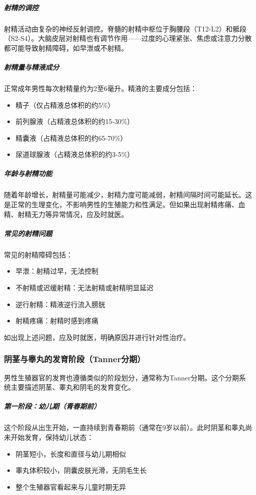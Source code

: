 \subparagraph{射精的调控}

射精活动由复杂的神经反射调控。脊髓的射精中枢位于胸腰段（T12-L2）和骶段（S2-S4）。大脑皮层对射精也有调节作用——过度的心理紧张、焦虑或注意力分散都可能导致射精障碍，如早泄或不射精。

\subparagraph{射精量与精液成分}

正常成年男性每次射精量约为2至6毫升。精液的主要成分包括：
\begin{itemize}
    \item 精子（仅占精液总体积的约5\%）
    \item 前列腺液（占精液总体积的约15-30\%）
    \item 精囊液（占精液总体积的约65-70\%）
    \item 尿道球腺液（占精液总体积的约3-5\%）
\end{itemize}

\subparagraph{年龄与射精功能}

随着年龄增长，射精量可能减少，射精力度可能减弱，射精间隔时间可能延长。这是正常的生理变化，不影响男性的生殖能力和性满足。但如果出现射精疼痛、血精、射精无力等异常情况，应及时就医。

\subparagraph{常见的射精问题}

常见的射精障碍包括：
\begin{itemize}
    \item 早泄：射精过早，无法控制
    \item 不射精或迟缓射精：无法射精或射精明显延迟
    \item 逆行射精：精液逆行流入膀胱
    \item 射精疼痛：射精时感到疼痛
\end{itemize}
如出现上述问题，应及时就医，明确原因并进行针对性治疗。

\subsubsection{阴茎与睾丸的发育阶段（Tanner分期）}

男性生殖器官的发育也遵循类似的阶段划分，通常称为Tanner分期。这个分期系统主要描述阴茎、睾丸和阴毛的发育变化。

\subparagraph{第一阶段：幼儿期（青春期前）}

这个阶段从出生开始，一直持续到青春期前（通常在9岁以前）。此时阴茎和睾丸尚未开始发育，保持幼儿状态：
\begin{itemize}
    \item 阴茎短小，长度和直径与幼儿期相似
    \item 睾丸体积较小，阴囊皮肤光滑，无阴毛生长
    \item 整个生殖器官看起来与儿童时期无异
\end{itemize}

